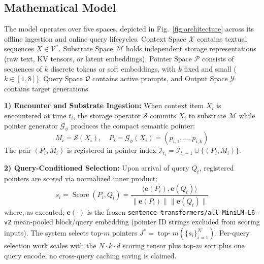\documentclass[runningheads]{llncs}
\begin{document}
\subsection{Mathematical Model}
The model operates over five spaces, depicted in Fig.~\ref{fig:architecture} across its offline ingestion and online query lifecycles. Context Space $\mathcal{X}$ contains textual sequences $X \in \mathcal{V}^*$. Substrate Space $\mathcal{M}$ holds independent storage representations (raw text, KV tensors, or latent embeddings). Pointer Space $\mathcal{P}$ consists of sequences of $k$ discrete tokens or soft embeddings, with $k$ fixed and small ($k \in [1, 8]$). Query Space $\mathcal{Q}$ contains active prompts, and Output Space $\mathcal{Y}$ contains target generations.

\noindent\textbf{1) Encounter and Substrate Ingestion:}
When context item $X_i$ is encountered at time $t_i$, the storage operator $\mathcal{S}$ commits $X_i$ to substrate $\mathcal{M}$ while pointer generator $\mathcal{G}_{\phi}$ produces the compact semantic pointer:
\begin{equation}
M_i = \mathcal{S}(X_i), \quad P_i = \mathcal{G}_{\phi}(X_i) = (p_{i,1}, \dots, p_{i,k})
\end{equation}
The pair $(P_i, M_i)$ is registered in pointer index $\mathcal{I}_{t_i} = \mathcal{I}_{t_{i}-1} \cup \{(P_i, M_i)\}$.

\noindent\textbf{2) Query-Conditioned Selection:}
Upon arrival of query $Q_t$, registered pointers are scored via normalized inner product:
\begin{equation}\label{eq:scoring}
s_i = \operatorname{Score}(P_i, Q_t) = \frac{\langle \mathbf{e}(P_i), \mathbf{e}(Q_t) \rangle}{\|\mathbf{e}(P_i)\| \|\mathbf{e}(Q_t)\|}
\end{equation}
where, as executed, $\mathbf{e}(\cdot)$ is the frozen \texttt{sentence-transformers/all-MiniLM-L6-v2} mean-pooled block/query embedding (pointer ID strings excluded from scoring inputs). The system selects top-$m$ pointers $J^* = \operatorname{top-}m (\{s_i\}_{i=1}^N)$. Per-query selection work scales with the $N{\cdot}k{\cdot}d$ scoring tensor plus top-$m$ sort plus one query encode; no cross-query caching saving is claimed.
\end{document}
